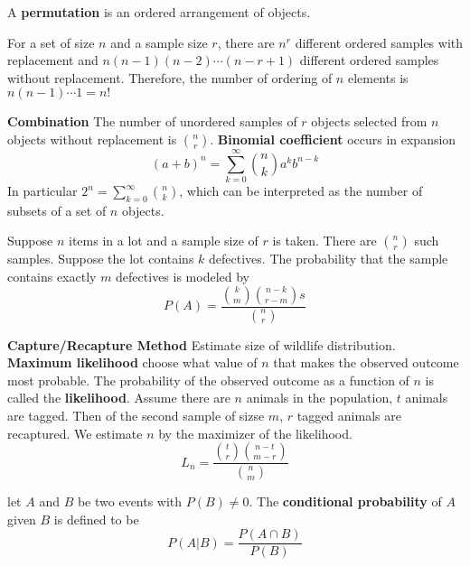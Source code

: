 \documentclass[11pt]{article}
\begin{document}
\begin{defn*}
  A \textbf{permutation} is an ordered arrangement of objects.
\end{defn*}

\begin{proposition*}
  For a set of size $n$ and a sample size $r$, there are $n^r$ different ordered samples with replacement and $n(n-1)(n-2)\cdots (n-r+1)$ different ordered samples without replacement. Therefore, the number of ordering of $n$ elements is $n(n-1)\cdots 1 = n!$
\end{proposition*}

\begin{proposition*}
  \textbf{Combination} The number of unordered samples of $r$ objects selected from $n$ objects without replacement is $\binom{n}{r}$. \textbf{Binomial coefficient} occurs in expansion
  \[
    (a+b)^n = \sum_{k=0}^{\infty} \binom{n}{k} a^k b^{n-k}
  \]
  In particular $2^n = \sum_{k=0}^{\infty} \binom{n}{k}$, which can be interpreted as the number of subsets of a set of $n$ objects.
\end{proposition*}

\begin{example}
  Suppose $n$ items in a lot and a sample size of $r$ is taken. There are $\binom{n}{r}$ such samples. Suppose the lot contains $k$ defectives. The probability that the sample contains exactly $m$ defectives is modeled by
  \[
    P(A) = \frac{\binom{k}{m}\binom{n-k}{r-m}s}{\binom{n}{r}}
  \]
\end{example}

\begin{example}
  \textbf{Capture/Recapture Method} Estimate size of wildlife distribution. \textbf{Maximum likelihood} choose what value of $n$ that makes the observed outcome most probable. The probability of the observed outcome as a function of $n$ is called the \textbf{likelihood}. Assume there are $n$ animals in the population, $t$ animals are tagged. Then of the second sample of sizse $m$, $r$ tagged animals are recaptured. We estimate $n$ by the maximizer of the likelihood.
  \[
    L_n = \frac{\binom{t}{r}\binom{n-t}{m-r}}{\binom{n}{m}}
  \]

\end{example}


\begin{defn*}
  let $A$ and $B$ be two events with $P(B) \neq 0$. The \textbf{conditional probability} of $A$ given $B$ is defined to be
  \[
    P(A|B)  = \frac{P(A\cap B)}{P(B)}
  \]
\end{defn*}
\end{document}

